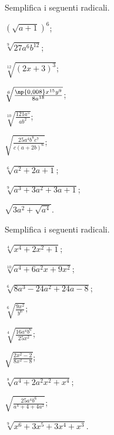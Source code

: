\begin{esercizio}[\Ast]
 \label{ese:2.29}
Semplifica i seguenti radicali.
 \begin{multicols}{3}
 \begin{enumeratea}
 \item $\left(\sqrt{a+1}\right)^6$;
 \item $\sqrt[9]{27a^6b^{12}}$;
 \item $\sqrt[12]{(2x+3)^3}$;
 \item $\sqrt[6]{\frac{\np{0,008}x^{15}y^9}{8a^{18}}}$;
 \item $\sqrt[10]{\frac{121a^5}{ab^2}}$;
 \item $\sqrt{\frac{25a^4b^8c^7}{c(a+2b)^6}}$;
 \item $\sqrt[6]{a^2+2a+1}$;
 \item $\sqrt[9]{a^3+3a^2+3a+1}$;
 \item $\sqrt{3a^2+\sqrt{a^4}}$.
 \end{enumeratea}
 \end{multicols}
\end{esercizio}

\begin{esercizio}[\Ast]
 \label{ese:2.30}
Semplifica i seguenti radicali.
 \begin{multicols}{3}
 \begin{enumeratea}
 \item $\sqrt[4]{x^4+2x^2+1}$;
 \item $\sqrt[10]{a^4+6a^2x+9x^2}$;
 \item $\sqrt[6]{8a^3-24a^2+24a-8}$;
 \item $\sqrt[6]{\frac{9x^2}{y^6}}$;
 \item $\sqrt[4]{\frac{16a^4b^6}{25x^2}}$;
 \item $\sqrt{\frac{2x^2-2}{8x^2-8}}$;
 \item $\sqrt[8]{a^4+2a^2x^2+x^4}$;
 \item $\sqrt{\frac{25a^4b^6}{a^4+4+4a^2}}$;
 \item $\sqrt[9]{x^6+3x^5+3x^4+x^3}$.
 \end{enumeratea}
 \end{multicols}
\end{esercizio}


